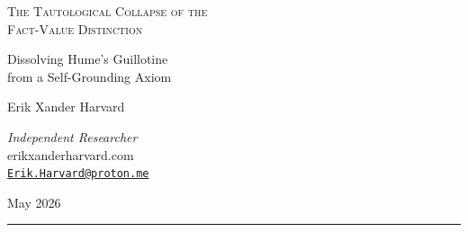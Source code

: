 \documentclass[12pt, letterpaper]{article}
\begin{document}
\thispagestyle{empty}

\begin{center}
    \vspace*{0.8in}

    {\LARGE\scshape The Tautological Collapse of the\\[0.3em]
    Fact-Value Distinction}

    \vspace{0.5em}

    {\large Dissolving Hume's Guillotine\\[0.3em]
    from a Self-Grounding Axiom}

    \vspace{2em}

    {\normalsize Erik Xander Harvard}

    \vspace{0.5em}

    {\small \textit{Independent Researcher}\\
    erikxanderharvard.com\\[0.3em]
    \href{mailto:Erik.Harvard@proton.me}{\texttt{Erik.Harvard@proton.me}}}

    \vspace{2em}

    {\small May 2026}

    \vspace{2em}

    \rule{0.6\textwidth}{0.4pt}
\end{center}

\vspace{1.5em}

\begin{abstract}
\noindent For nearly three centuries, Hume's guillotine has been treated as a permanent feature of the philosophical landscape: no ``ought'' can be derived from an ``is.'' Every major attempt to bridge the gap---from Moore's naturalistic ethics to Foot's natural goodness to Searle's institutional facts---has accepted the gap's foundational premise: that facts and values are ontologically distinct categories requiring a bridge. This paper argues that no bridge is needed because the gap does not exist. The is-ought distinction is one mask of a deeper fracture between knowing and being that dissolves when both are recognized as aspects of a single self-grounding structure: $\exists(\exists) \equiv \exists$ (Being recognizing itself IS Being). From this axiom, the paper derives an eight-stage chain from meta-tautology to natural law and sovereignty, showing that normativity is not imposed on reality but IS reality's structure for agents. Etymological evidence confirms the dissolution: ``right'' means both morally good and factually correct across multiple major language families---not by accident but because both senses name the same structural property. Hume did not discover a gap. He fractured a unity that language had preserved for millennia.
\end{abstract}
\end{document}
